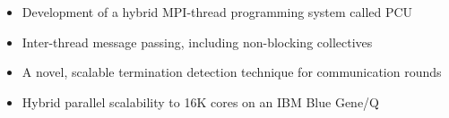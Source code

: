 \documentclass{letter}
\begin{document}
\begin{itemize}
\item Development of a hybrid MPI-thread programming system called PCU
\item Inter-thread message passing, including non-blocking collectives
\item A novel, scalable termination detection technique for communication rounds
\item Hybrid parallel scalability to 16K cores on an IBM Blue Gene/Q
\end{itemize}
\end{document}

